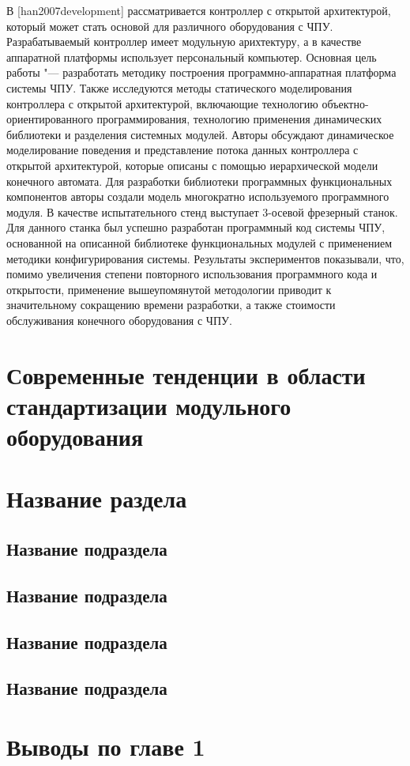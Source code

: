 В [han2007development] рассматривается контроллер с открытой архитектурой, который может стать основой для различного оборудования с ЧПУ. Разрабатываемый контроллер имеет модульную арихтектуру, а в качестве аппаратной платформы использует персональный компьютер. Основная цель работы "--- разработать методику построения программно-аппаратная платформа системы ЧПУ. Также исследуются методы статического моделирования контроллера с открытой архитектурой, включающие технологию объектно-ориентированного программирования, технологию применения динамических библиотеки и разделения системных модулей. Авторы обсуждают динамическое моделирование поведения и представление потока данных контроллера с открытой архитектурой, которые описаны с помощью иерархической модели конечного автомата. Для разработки библиотеки программных функциональных компонентов авторы создали модель многократно используемого программного модуля. В качестве испытательного стенд выступает 3-осевой фрезерный станок. Для данного станка был успешно разработан программный код системы ЧПУ, основанной на описанной библиотеке функциональных модулей с применением методики конфигурирования системы. Результаты экспериментов показывали, что, помимо увеличения степени повторного использования программного кода и открытости, применение вышеупомянутой методологии приводит к значительному сокращению времени разработки, а также стоимости обслуживания конечного оборудования с ЧПУ.

\section{Современные тенденции в области стандартизации модульного оборудования}


\section{Название раздела}\label{sec:ch1/sec3}

\subsection{Название подраздела}\label{subsec:ch1/sec3/sub1}

\subsection{Название подраздела}\label{subsec:ch1/sec3/sub2}

\subsection{Название подраздела}\label{subsec:ch1/sec3/sub3}

\subsection{Название подраздела}\label{subsec:ch1/sec3/sub4}

\section{Выводы по главе 1}

\FloatBarrier
